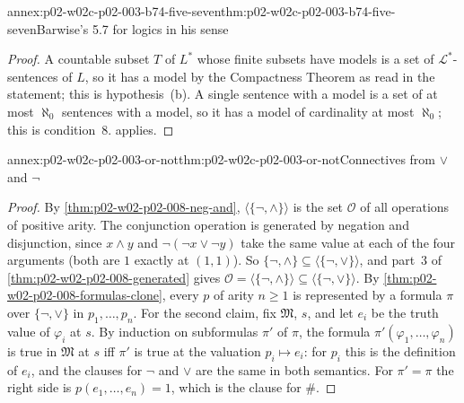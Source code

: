 \begin{annexitem}{annex:p02-w02c-p02-003-b74-five-seven}{thm:p02-w02c-p02-003-b74-five-seven}{Barwise's 5.7 for logics in his sense}
\begin{proof}
A countable subset \(T\) of \(L^{\ast}\) whose finite subsets have models is
a set of \(\mathcal L^{\ast}\)-sentences of \(L\), so it has a model by the
Compactness Theorem as read in the statement; this is hypothesis~(b).  A
single sentence with a model is a set of at most \(\aleph_0\) sentences with
a model, so it has a model of cardinality at most \(\aleph_0\); this is
condition~8.   applies.
\end{proof}
\end{annexitem}

\begin{annexitem}{annex:p02-w02c-p02-003-or-not}{thm:p02-w02c-p02-003-or-not}{Connectives from \(\lor\) and \(\neg\)}
\begin{proof}
By \cref{thm:p02-w02-p02-008-neg-and}, \(\langle\{\neg,\land\}\rangle\) is
the set \(\mathcal O\) of all operations of positive arity.  The
conjunction operation is generated by negation and disjunction, since
\(x\land y\) and \(\neg(\neg x\lor\neg y)\) take the same value at each of
the four arguments (both are \(1\) exactly at \((1,1)\)).  So
\(\{\neg,\land\}\subseteq\langle\{\neg,\lor\}\rangle\), and part~3 of
\cref{thm:p02-w02-p02-008-generated} gives
\(\mathcal O=\langle\{\neg,\land\}\rangle\subseteq\langle\{\neg,\lor\}\rangle\).
By \cref{thm:p02-w02-p02-008-formulas-clone}, every \(p\) of arity
\(n\geq1\) is represented by a formula \(\pi\) over \(\{\neg,\lor\}\) in
\(p_1,\ldots,p_n\).  For the second claim, fix \(\mathfrak M\), \(s\), and
let \(e_i\) be the truth value of \(\varphi_i\) at \(s\).  By induction on
subformulas \(\pi'\) of \(\pi\), the formula \(\pi'(\varphi_1,\ldots,
\varphi_n)\) is true in \(\mathfrak M\) at \(s\) iff \(\pi'\) is true at the
valuation \(p_i\mapsto e_i\): for \(p_i\) this is the definition of
\(e_i\), and the clauses for \(\neg\) and \(\lor\) are the same in both
semantics.  For \(\pi'=\pi\) the right side is \(p(e_1,\ldots,e_n)=1\),
which is the clause for \(\#\).
\end{proof}
\end{annexitem}

